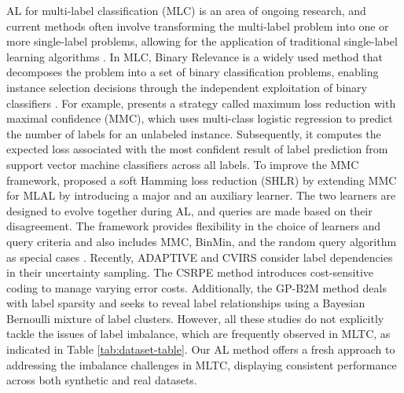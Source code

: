 \documentclass[letterpaper]{article} %
\begin{document}
AL for multi-label classification (MLC) is an area of ongoing research, and current methods often involve transforming the multi-label problem into one or more single-label problems, allowing for the application of traditional single-label learning algorithms \cite{Cherman2019, REYES2018494}. In MLC, Binary Relevance is a widely used method that decomposes the problem into a set of binary classification problems, enabling instance selection decisions through the independent exploitation of binary classifiers \cite{pmlr-v97-shi19b}.
For example, \citet{mmc2009} presents a strategy called maximum loss reduction with maximal confidence (MMC), which uses multi-class logistic regression to predict the number of labels for an unlabeled instance. Subsequently, it computes the expected
loss associated with the most
confident result of label prediction from support vector machine classifiers across all labels. 
To improve the MMC framework, \citet{pmlr-v20-hung11} proposed a soft Hamming loss reduction (SHLR) by extending MMC for MLAL by introducing a major and an auxiliary learner. The two learners are designed to evolve together during AL, and queries are made based on their disagreement. The framework provides flexibility in the choice of learners and query criteria and also includes MMC, BinMin, and the random query algorithm as special cases \cite{10.1007/978-3-319-97304-3_73, REYES2018494}.
Recently, ADAPTIVE \cite{adaptive2013} and CVIRS \cite{REYES2018494}  consider
label dependencies in their uncertainty sampling. 
The CSRPE \cite{10.1007/978-3-319-93034-3_12} method introduces cost-sensitive coding to manage varying error costs. Additionally, the GP-B2M \cite{gaupb2_2021} method deals with label sparsity and seeks to reveal label relationships using a Bayesian Bernoulli mixture of label clusters.
However, all these studies do not explicitly tackle the issues of label imbalance, which are frequently observed in MLTC, as indicated in Table \ref{tab:dataset-table}. 
Our AL method offers a fresh approach to addressing the imbalance challenges in MLTC, displaying consistent performance across both synthetic and real datasets.
\end{document}
